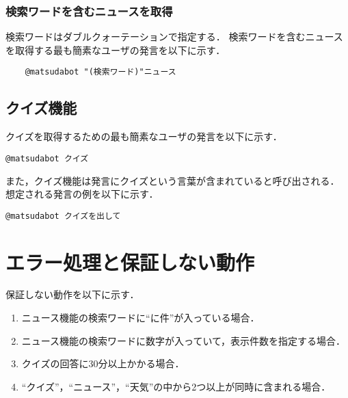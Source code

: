 \documentclass[12pt]{jsarticle}
\begin{document}
\subsubsection{検索ワードを含むニュースを取得}
検索ワードはダブルクォーテーションで指定する．
検索ワードを含むニュースを取得する最も簡素なユーザの発言を以下に示す．
\begin{verbatim}
	@matsudabot "(検索ワード)"ニュース
\end{verbatim}
\subsection{クイズ機能}
クイズを取得するための最も簡素なユーザの発言を以下に示す．
\begin{verbatim}
@matsudabot クイズ
\end{verbatim}
また，クイズ機能は発言にクイズという言葉が含まれていると呼び出される．
想定される発言の例を以下に示す．
\begin{verbatim}
@matsudabot クイズを出して
\end{verbatim}

\section{エラー処理と保証しない動作}
保証しない動作を以下に示す．
\begin{enumerate}
\item ニュース機能の検索ワードに``に件''が入っている場合．
\item ニュース機能の検索ワードに数字が入っていて，表示件数を指定する場合．
\item クイズの回答に30分以上かかる場合．
\item ``クイズ''，``ニュース''，``天気''の中から2つ以上が同時に含まれる場合．
\end{enumerate}



\end{document}
